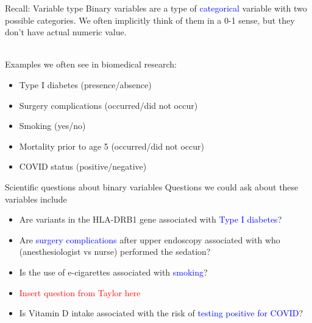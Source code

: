 \documentclass{beamer}
\begin{document}
\begin{frame}{Recall: Variable type}
Binary variables are a type of \textcolor{blue}{categorical} variable with two possible categories. We often implicitly think of them in a 0-1 sense, but they don't have actual numeric value. 
\\~\

Examples we often see in biomedical research: 
\begin{itemize}
	\item Type I diabetes (presence/absence)
	\item Surgery complications (occurred/did not occur)
	\item Smoking (yes/no)
	\item Mortality prior to age 5 (occurred/did not occur)
	\item COVID status (positive/negative)
\end{itemize}
\end{frame}

\begin{frame}{Scientific questions about binary variables}
	Questions we could ask about these variables include
	\begin{itemize}
		\item Are variants in the HLA-DRB1 gene associated with \textcolor{blue}{Type I diabetes}? 
		\item Are \textcolor{blue}{surgery complications} after upper endoscopy associated with who (anesthesiologist vs nurse) performed the sedation?
		\item Is the use of e-cigarettes associated with \textcolor{blue}{smoking}?
		\item \textcolor{red}{Insert question from Taylor here}
		\item Is Vitamin D intake associated with the risk of \textcolor{blue}{testing positive for COVID}?
	\end{itemize}
\end{frame}
\end{document}
